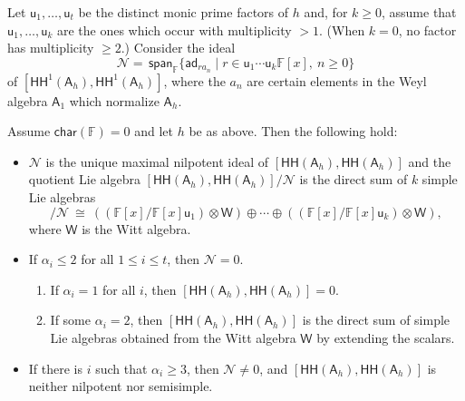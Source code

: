 \documentclass{commat}
\newcommand{\FF}{\mathbb{F}}
\newcommand{\A}{\mathsf{A}}
\newcommand{\W}{\mathsf{W}}
\newcommand{\pr}{\mathsf{u}}
\newcommand\chara{\mathsf {char}}
\newcommand\hoch{\mathsf{HH}}
\newcommand\spann{\, \mathsf{span}}
\newcommand\ad{\mathsf{ad}}
\begin{document}
Let $\pr_1, \dots, \pr_t$ be the distinct monic prime factors of $h$ and, for $k \geq 0$, assume that $\pr_1, \ldots, \pr_k$ are the ones which occur with multiplicity $>1$. (When $k = 0$, no factor has multiplicity $\geq 2$.) Consider the ideal 
\begin{equation*} 
	\mathcal N=\spann_\FF\{\ad_{r a_n}\mid r \in  \pr_1 \cdots \pr_k\FF[x], \ n \geq 0\} 
\end{equation*} 
of $[\hoch^1(\A_{h}), \hoch^1(\A_{h})]$, where the $a_n$ are certain elements in the Weyl algebra $\A_1$ which normalize $\A_h$.


\begin{corollary}\label{cor:structureL}
	Assume $\chara(\FF) = 0$ and let $h$ be as above. Then the following hold:
	\begin{itemize}
		\item[{\rm (i)}]  $\mathcal N$ is the unique maximal nilpotent ideal of $[\hoch(\A_{h}), \hoch(\A_{h})]$ and the quotient  Lie algebra
		$[\hoch(\A_{h}), \hoch(\A_{h})]/\mathcal N$ is the direct sum of $k$ simple Lie algebras  
		\begin{equation*}%
			[\hoch(\A_{h}), \hoch(\A_{h})]/\mathcal N \  \cong \  \left( (\FF[x]/\FF[x] \pr_{1}) \otimes \mathsf{W} \right)\oplus \cdots\oplus \left( (\FF[x]/\FF[x] \pr_{k}) \otimes \mathsf{W} \right),
		\end{equation*} 
		where $\mathsf{W}$ is the Witt algebra. 
		\item[{\rm (ii)}]  If $\alpha_{i}\leq 2$ for all $1\leq i\leq t$, then $\mathcal N=0$. 
		\begin{enumerate}
			\item[{\rm (a)}] If  $\alpha_{i}=1$ for all $i$, then $[\hoch(\A_{h}), \hoch(\A_{h})] = 0$.   
			\item[{\rm (b)}] If some $\alpha_i = 2$,
			then $[\hoch(\A_{h}), \hoch(\A_{h})] $ is the direct sum of simple Lie algebras obtained from the Witt algebra $\W$ by extending the scalars. 
		\end{enumerate}
		\item[{\rm (iii)}] If there is $i$ such that $\alpha_{i}\geq 3$, then $\mathcal N\neq 0$,  and $[\hoch(\A_{h}), \hoch(\A_{h})]$ is neither nilpotent nor semisimple.
	\end{itemize}
\end{corollary} 
\newpage
\end{document}
